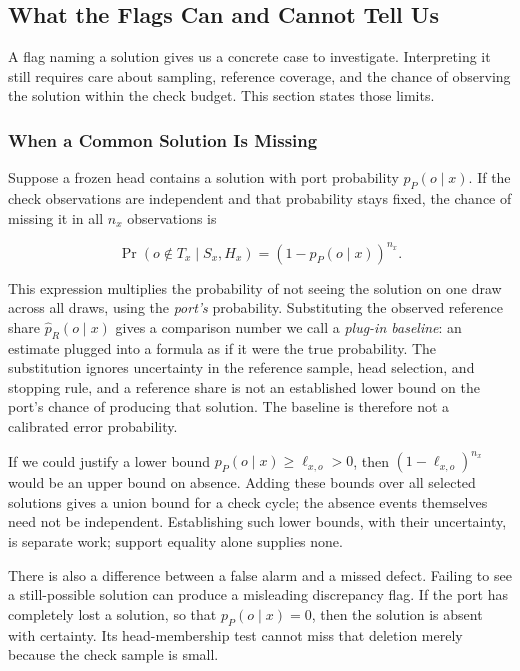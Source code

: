 \documentclass[10pt,letterpaper]{article}
\begin{document}
\subsection{What the Flags Can and Cannot Tell Us}\label{sec:statistics}

A flag naming a solution gives us a concrete case to investigate. Interpreting it still
requires care about sampling, reference coverage, and the chance of observing the solution
within the check budget. This section states those limits.

\subsubsection{When a Common Solution Is Missing}\label{sec:absence}

Suppose a frozen head contains a solution with port probability \(p_P(o\mid x)\). If the
check observations are independent and that probability stays fixed, the chance of missing
it in all \(n_x\) observations is

\[
\Pr(o\notin T_x\mid S_x,H_x)=(1-p_P(o\mid x))^{n_x}.
\]

This expression multiplies the probability of not seeing the solution on one draw across
all draws, using the \emph{port's} probability. Substituting the observed reference share
\(\widehat p_R(o\mid x)\) gives a comparison number we call a \emph{plug-in baseline}: an
estimate plugged into a formula as if it were the true probability. The substitution
ignores uncertainty in the reference sample, head selection, and stopping rule, and a
reference share is not an established lower bound on the port's chance of producing that
solution. The baseline is therefore not a calibrated error probability.

If we could justify a lower bound \(p_P(o\mid x)\ge\ell_{x,o}>0\), then
\((1-\ell_{x,o})^{n_x}\) would be an upper bound on absence. Adding these bounds over all
selected solutions gives a union bound for a check cycle; the absence events themselves
need not be independent. Establishing such lower bounds, with their uncertainty, is
separate work; support equality alone supplies none.

There is also a difference between a false alarm and a missed defect. Failing to see a
still-possible solution can produce a misleading discrepancy flag. If the port has
completely lost a solution, so that \(p_P(o\mid x)=0\), then the solution is absent with
certainty. Its head-membership test cannot miss that deletion merely because the check
sample is small.
\end{document}
